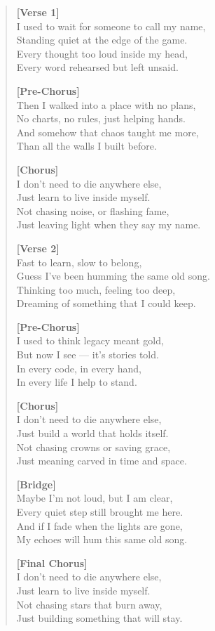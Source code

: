 \documentclass[
  letterpaper,
  DIV=11,
  numbers=noendperiod]{scrreprt}
\begin{document}
\begin{quote}
\textbf{{[}Verse 1{]}}\\
I used to wait for someone to call my name,\\
Standing quiet at the edge of the game.\\
Every thought too loud inside my head,\\
Every word rehearsed but left unsaid.

\textbf{{[}Pre-Chorus{]}}\\
Then I walked into a place with no plans,\\
No charts, no rules, just helping hands.\\
And somehow that chaos taught me more,\\
Than all the walls I built before.

\textbf{{[}Chorus{]}}\\
I don't need to die anywhere else,\\
Just learn to live inside myself.\\
Not chasing noise, or flashing fame,\\
Just leaving light when they say my name.

\textbf{{[}Verse 2{]}}\\
Fast to learn, slow to belong,\\
Guess I've been humming the same old song.\\
Thinking too much, feeling too deep,\\
Dreaming of something that I could keep.

\textbf{{[}Pre-Chorus{]}}\\
I used to think legacy meant gold,\\
But now I see --- it's stories told.\\
In every code, in every hand,\\
In every life I help to stand.

\textbf{{[}Chorus{]}}\\
I don't need to die anywhere else,\\
Just build a world that holds itself.\\
Not chasing crowns or saving grace,\\
Just meaning carved in time and space.

\textbf{{[}Bridge{]}}\\
Maybe I'm not loud, but I am clear,\\
Every quiet step still brought me here.\\
And if I fade when the lights are gone,\\
My echoes will hum this same old song.

\textbf{{[}Final Chorus{]}}\\
I don't need to die anywhere else,\\
Just learn to live inside myself.\\
Not chasing stars that burn away,\\
Just building something that will stay.
\end{quote}
\end{document}
